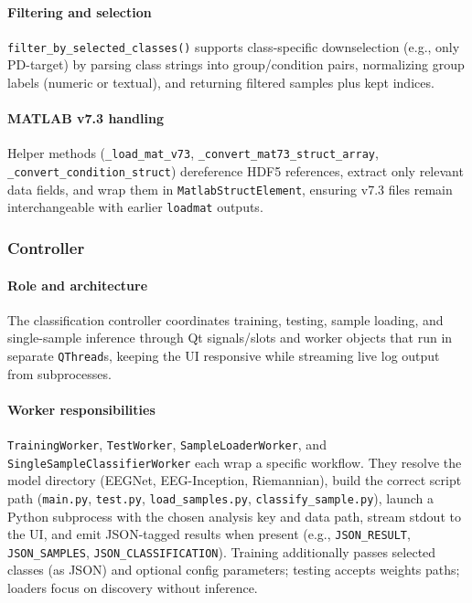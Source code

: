 \documentclass[12pt]{report}
\begin{document}
\paragraph{Filtering and selection}\mbox{}

\texttt{filter\_by\_selected\_classes()} supports class-specific downselection (e.g., only PD-target) by parsing class strings into group/condition pairs, normalizing group labels (numeric or textual), and returning filtered samples plus kept indices.

\paragraph{MATLAB v7.3 handling}\mbox{}

Helper methods (\texttt{\_load\_mat\_v73}, \texttt{\_convert\_mat73\_struct\_array}, \texttt{\_convert\_condition\_struct}) dereference HDF5 references, extract only relevant data fields, and wrap them in \texttt{MatlabStructElement}, ensuring v7.3 files remain interchangeable with earlier \texttt{loadmat} outputs.


\subsubsection{Controller}

\paragraph{Role and architecture}\mbox{}

The classification controller coordinates training, testing, sample loading, and single-sample inference through Qt signals/slots and worker objects that run in separate \texttt{QThread}s, keeping the UI responsive while streaming live log output from subprocesses.

\paragraph{Worker responsibilities}\mbox{}

\texttt{TrainingWorker}, \texttt{TestWorker}, \texttt{SampleLoaderWorker}, and \texttt{SingleSampleClassifierWorker} each wrap a specific workflow. They resolve the model directory (EEGNet, EEG-Inception, Riemannian), build the correct script path (\texttt{main.py}, \texttt{test.py}, \texttt{load\_samples.py}, \texttt{classify\_sample.py}), launch a Python subprocess with the chosen analysis key and data path, stream stdout to the UI, and emit JSON-tagged results when present (e.g., \texttt{JSON\_RESULT}, \texttt{JSON\_SAMPLES}, \texttt{JSON\_CLASSIFICATION}). Training additionally passes selected classes (as JSON) and optional config parameters; testing accepts weights paths; loaders focus on discovery without inference.
\end{document}
